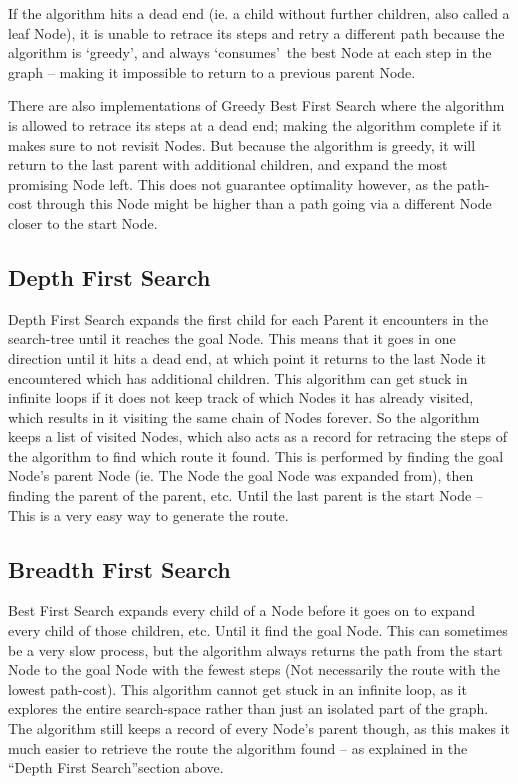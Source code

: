 If the algorithm hits a dead end (ie. a child without further children, also called a leaf Node), it is unable to retrace its steps and retry a different path because the algorithm is \textquoteleft greedy\textquoteright, and always \textquoteleft consumes\textquoteright~the best Node at each step in the graph -- making it impossible to return to a previous parent Node.

There are also implementations of Greedy Best First Search where the algorithm is allowed to retrace its steps at a dead end; making the algorithm complete if it makes sure to not revisit Nodes. But because the algorithm is greedy, it will return to the last parent with additional children, and expand the most promising Node left. This does not guarantee optimality however, as the path-cost through this Node might be higher than a path going via a different Node closer to the start Node.

\newpage
\subsection{Depth First Search}
Depth First Search expands the first child for each Parent it encounters in the search-tree until it reaches the goal Node. This means that it goes in one direction until it hits a dead end, at which point it returns to the last Node it encountered which has additional children. This algorithm can get stuck in infinite loops if it does not keep track of which Nodes it has already visited, which results in it visiting the same chain of Nodes forever. So the algorithm keeps a list of visited Nodes, which also acts as a record for retracing the steps of the algorithm to find which route it found. This is performed by finding the goal Node's parent Node (ie. The Node the goal Node was expanded from), then finding the parent of the parent, etc. Until the last parent is the start Node -- This is a very easy way to generate the route.

\subsection{Breadth First Search}
Best First Search expands every child of a Node before it goes on to expand every child of those children, etc. Until it find the goal Node. This can sometimes be a very slow process, but the algorithm always returns the path from the start Node to the goal Node with the fewest steps (Not necessarily the route with the lowest path-cost). This algorithm cannot get stuck in an infinite loop, as it explores the entire search-space rather than just an isolated part of the graph. The algorithm still keeps a record of every Node's parent though, as this makes it much easier to retrieve the route the algorithm found -- as explained in the \textquotedblleft Depth First Search\textquotedblright section above.

